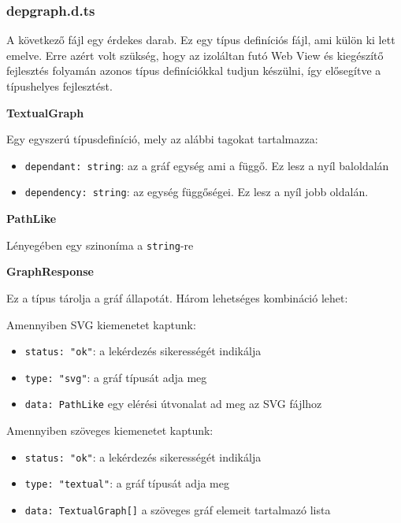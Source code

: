\subsubsection{depgraph.d.ts}

A következő fájl egy érdekes darab. Ez egy típus definíciós fájl, ami külön ki lett emelve. Erre azért volt szükség, hogy az izoláltan futó Web View és kiegészítő fejlesztés folyamán azonos típus definíciókkal tudjun készülni, így elősegítve a típushelyes fejlesztést.


\vspace{14pt}
\noindent \textbf{TextualGraph}

\noindent Egy egyszerú típusdefiníció, mely az alábbi tagokat tartalmazza:

\begin{itemize}
    \item \lstinline{dependant: string}: az a gráf egység ami a függő. Ez lesz a nyíl baloldalán
    \item \lstinline{dependency: string}: az egység függőségei. Ez lesz a nyíl jobb oldalán.
\end{itemize}



\vspace{14pt}
\noindent \textbf{PathLike} 

\noindent Lényegében egy szinoníma a \lstinline{string}-re



\vspace{14pt}
\noindent \textbf{GraphResponse}


\noindent Ez a típus tárolja a gráf állapotát. Három lehetséges kombináció lehet:

\noindent Amennyiben SVG kiemenetet kaptunk:
\begin{itemize}
    \item \lstinline{status: "ok"}: a lekérdezés sikerességét indikálja
    \item \lstinline{type: "svg"}: a gráf típusát adja meg
    \item \lstinline{data: PathLike} egy elérési útvonalat ad meg az SVG fájlhoz
\end{itemize}

\noindent Amennyiben szöveges kiemenetet kaptunk:
\begin{itemize}
    \item \lstinline{status: "ok"}: a lekérdezés sikerességét indikálja
    \item \lstinline{type: "textual"}: a gráf típusát adja meg
    \item \lstinline{data: TextualGraph[]} a szöveges gráf elemeit tartalmazó lista
\end{itemize}


